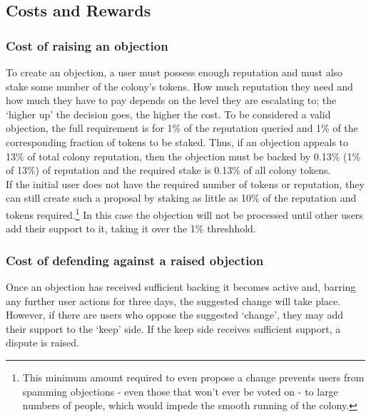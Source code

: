 
\subsection{Costs and Rewards}\label{sec:costs-of-disputes}
\subsubsection{Cost of raising an objection}
To create an objection, a user must possess enough reputation and must also stake some number of the colony's tokens. How much reputation they need and how much they have to pay depends on the level they are escalating to; the `higher up' the decision goes, the higher the cost. To be considered a valid objection, the full requirement is for 1\% of the reputation queried and 1\% of the corresponding fraction of tokens to be staked. Thus, if an objection appeals to 13\% of total colony reputation, then the objection must be backed by 0.13\% (1\% of 13\%) of reputation and the required stake is 0.13\% of all colony tokens.\\
If the initial user does not have the required number of tokens or reputation, they can still create such a proposal by staking as little as 10\% of the reputation and tokens required.\footnote{This minimum amount required to even propose a change prevents users from spamming objections - even those that won’t ever be voted on - to large numbers of people, which would impede the smooth running of the colony.} In this case the objection will not be processed until other users add their support to it, taking it over the 1\% threshhold. 

\subsubsection{Cost of defending against a raised objection}
Once an objection has received sufficient backing it becomes active and, barring any further user actions for three days, the suggested change will take place. 
However, if there are users who oppose the suggested `change', they may add their support to the `keep' side. If the keep side receives sufficient support, a dispute is raised. 

